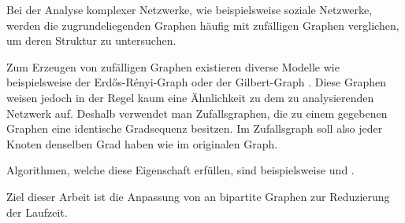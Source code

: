 Bei der Analyse komplexer Netzwerke, wie beispielsweise soziale Netzwerke, 
werden die zugrundeliegenden Graphen häufig mit zufälligen Graphen verglichen, 
um deren Struktur zu untersuchen\cite{DBLP:conf/esa/CarstensH0PTW18}.

Zum Erzeugen von zufälligen Graphen existieren diverse Modelle wie 
beispielsweise der Erd\H{o}s-R\'enyi-Graph \cite{erdos}
oder der Gilbert-Graph \cite{gilbert}.
Diese Graphen
weisen jedoch in der Regel kaum eine Ähnlichkeit zu dem zu analysierenden Netzwerk auf.
Deshalb verwendet man Zufallsgraphen, die zu einem gegebenen Graphen eine identische Gradsequenz
besitzen. Im Zufallsgraph soll also jeder Knoten denselben Grad haben wie im originalen Graph.

Algorithmen, welche diese Eigenschaft erfüllen, sind beispielsweise \cb{} \cite{curveball} und \gc{}.

Ziel dieser Arbeit ist die Anpassung von \gc{} an bipartite Graphen zur 
Reduzierung der Laufzeit. 
